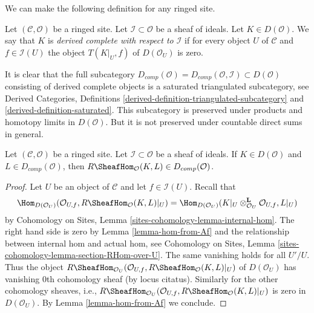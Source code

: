 \noindent
We can make the following definition for any ringed site.

\begin{definition}
\label{definition-derived-complete}
Let $(\mathcal{C}, \mathcal{O})$ be a ringed site.
Let $\mathcal{I} \subset \mathcal{O}$ be a sheaf of ideals.
Let $K \in D(\mathcal{O})$. We say that $K$ is
{\it derived complete with respect to $\mathcal{I}$}
if for every object $U$ of $\mathcal{C}$ and $f \in \mathcal{I}(U)$
the object $T(K|_U, f)$ of $D(\mathcal{O}_U)$ is zero.
\end{definition}

\noindent
It is clear that the full subcategory
$D_{comp}(\mathcal{O}) = D_{comp}(\mathcal{O}, \mathcal{I}) \subset
D(\mathcal{O})$ consisting of derived complete objects
is a saturated triangulated subcategory, see
Derived Categories, Definitions
\ref{derived-definition-triangulated-subcategory} and
\ref{derived-definition-saturated}. This subcategory is preserved
under products and homotopy limits in $D(\mathcal{O})$.
But it is not preserved under countable direct sums in general.

\begin{lemma}
\label{lemma-derived-complete-internal-hom}
Let $(\mathcal{C}, \mathcal{O})$ be a ringed site.
Let $\mathcal{I} \subset \mathcal{O}$ be a sheaf of ideals.
If $K \in D(\mathcal{O})$ and $L \in D_{comp}(\mathcal{O})$, then
$R\SheafHom_\mathcal{O}(K, L) \in D_{comp}(\mathcal{O})$.
\end{lemma}

\begin{proof}
Let $U$ be an object of $\mathcal{C}$ and let $f \in \mathcal{I}(U)$.
Recall that
$$
\Hom_{D(\mathcal{O}_U)}(\mathcal{O}_{U, f}, R\SheafHom_\mathcal{O}(K, L)|_U)
=
\Hom_{D(\mathcal{O}_U)}(
K|_U \otimes_{\mathcal{O}_U}^\mathbf{L} \mathcal{O}_{U, f}, L|_U)
$$
by Cohomology on Sites, Lemma \ref{sites-cohomology-lemma-internal-hom}.
The right hand side is zero by Lemma \ref{lemma-hom-from-Af}
and the relationship between internal hom and actual hom, see
Cohomology on Sites, Lemma \ref{sites-cohomology-lemma-section-RHom-over-U}.
The same vanishing holds for all $U'/U$. Thus the object
$R\SheafHom_{\mathcal{O}_U}(\mathcal{O}_{U, f},
R\SheafHom_\mathcal{O}(K, L)|_U)$ of $D(\mathcal{O}_U)$ has vanishing
$0$th cohomology sheaf (by locus citatus). Similarly for the other
cohomology sheaves, i.e., $R\SheafHom_{\mathcal{O}_U}(\mathcal{O}_{U, f},
R\SheafHom_\mathcal{O}(K, L)|_U)$ is zero in $D(\mathcal{O}_U)$.
By Lemma \ref{lemma-hom-from-Af} we conclude.
\end{proof}


